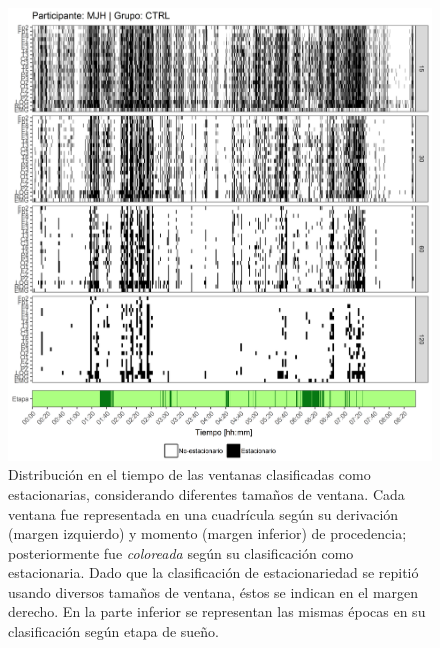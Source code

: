 \documentclass[12pt,letterpaper,draft]{book}
\begin{document}
\begin{figure}
\centering
\includegraphics[width=\linewidth]
{./scripts_graf_res/MJH_patrones_2.png}
\caption[Distribución en el tiempo de las ventanas clasificadas como estacionarias, considerando diferentes tamaños de ventana]{Distribución en el tiempo de las ventanas clasificadas como estacionarias, considerando diferentes tamaños de ventana. 
Cada ventana fue representada en una cuadrícula según su derivación (margen izquierdo) y momento (margen inferior) de procedencia; posteriormente fue \textit{coloreada} según su clasificación como estacionaria.
Dado que la clasificación de estacionariedad se repitió usando diversos tamaños de ventana, éstos se indican en el margen derecho.
En la parte inferior se representan las mismas épocas en su clasificación según etapa de sueño.}
\end{figure}
\end{document}
